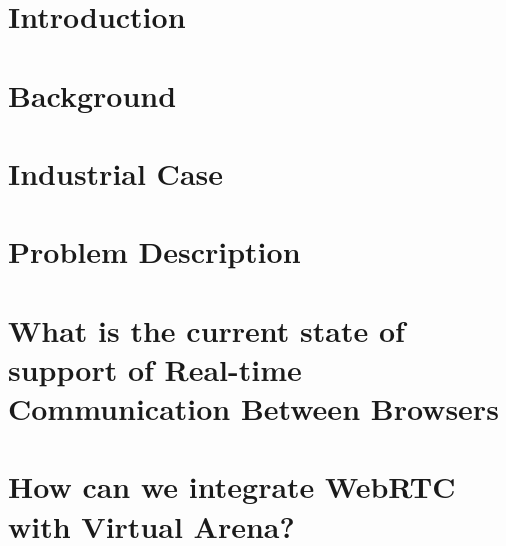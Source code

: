 \chapter{Introduction}


\chapter{Background}


%

%

\chapter{Industrial Case}


\chapter{Problem Description}




\chapter{What is the current state of support of Real-time Communication Between Browsers}


\chapter{How can we integrate WebRTC with Virtual Arena?}



